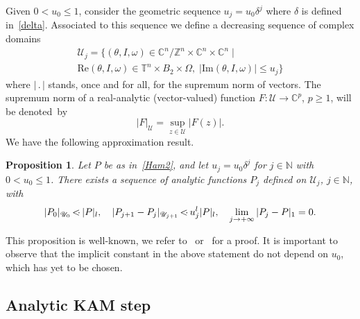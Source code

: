 \documentclass[JEP,XML,SOM,Unicode]{cedram}
\let\mathcal\mathscr
\let\sep\mid
\numberwithin{equation}{section}
\theoremstyle{plain}
\newtheorem{proposition}[theorem]{Proposition}
\theoremstyle{definition}
\newcommand{\N}{\mathbb{N}}
\newcommand{\Z}{\mathbb{Z}}
\renewcommand{\C}{\mathbb{C}}
\newcommand\T{\mathbb T}
\newcommand\MP{\,{<\hspace{-.5em}\cdot}\,}
\begin{document}
Given $0< u_0 \leq 1$, consider the geometric sequence $u_j=u_0\delta^{j}$ where $\delta$ is defined in~\eqref{delta}. Associated to this sequence we define a decreasing sequence of complex domains
\begin{multline}\label{complexdom}
\mathcal{U}_j= \{(\theta,I,\omega) \in \C^n/\Z^n \times \C^n \times \C^n \sep\\
\mathrm{Re}(\theta,I,\omega) \in \T^n \times B_2 \times \Omega, \; |\mathrm{Im}(\theta,I,\omega)| \leq u_j
\}
\end{multline}
where $|\,.\,|$ stands, once and for all, for the supremum norm of vectors. The supremum norm of a real-analytic (vector-valued) function $F : \mathcal{U} \to \C^p$, $p \geq 1$, will be denoted~by
\[ |F|_{\mathcal{U}}=\sup_{z \in \mathcal{U}} |F(z)|. \]
We have the following approximation result.

\begin{proposition}\label{smoothing}
Let $P$ be as in~\eqref{Ham2}, and let $u_j=u_0\delta^{j}$ for $j \in \N$ with $0< u_0 \leq 1$. There exists a sequence of analytic functions $P_j$ defined on $\mathcal{U}_j$, $j \in \N$, with
\[ |P_0|_{\mathcal{U}_0} \MP |P|_l, \quad |P_{j+1}-P_{j}|_{\mathcal{U}_{j+1}} \MP u_{j}^l|P|_l, \quad \lim_{j \to +\infty}|P_j-P|_1=0. \]
\end{proposition}

This proposition is well-known, we refer to~\cite{Zeh75} or~\cite{Sal04} for a proof. It is important to observe that the implicit constant in the above statement do not depend on $u_0$, which has yet to be chosen.

\subsection{Analytic KAM step}
\end{document}
